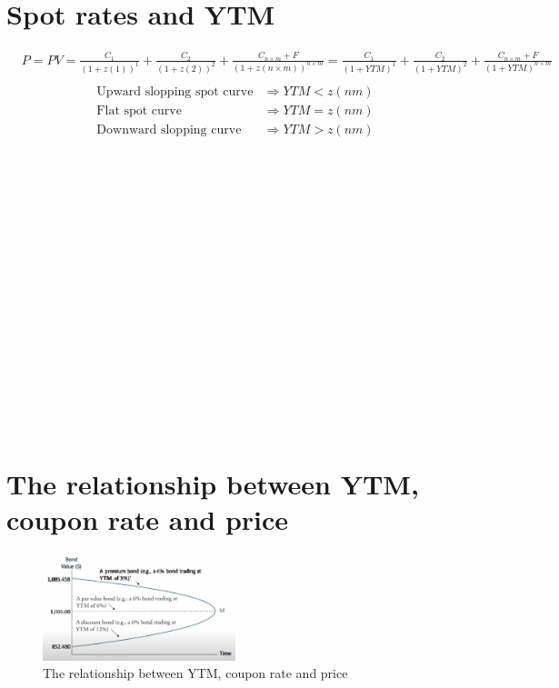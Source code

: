 \documentclass{article}
\begin{document}
 \section{Spot rates and YTM}
 \begin{align*}
    & P = PV = \frac{C_{1}}{(1 + z(1))^{1}} + \frac{C_{2}}{(1 + z(2))^{2}} + \frac{C_{n \times m} + F}{(1 + z(n \times m))^{n \times m}} = \frac{C_{1}}{(1 + YTM)^{1}} + \frac{C_{2}}{(1 + YTM)^{2}} + \frac{C_{n \times m} + F}{(1 + YTM)^{n \times m}}\\
\end{align*}
 \begin{align*}
    \text{Upward slopping spot curve} & \Rightarrow YTM<z(nm)\\
    \text{Flat spot curve} & \Rightarrow YTM=z(nm)\\
    \text{Downward slopping curve} & \Rightarrow YTM>z(nm)\\
\end{align*}
\\ \\ \\ \\ \\ \\ \\ \\ \\ \\ \\ \\ \\ \\ \\ \\
 \section{The relationship between YTM, coupon rate and price}
\begin{figure}[h]
\centering
\includegraphics[width=0.5\textwidth]{bond_curve.png}
\caption{The relationship between YTM, coupon rate and price}
\label{loadings}
\end{figure}
\end{document}
